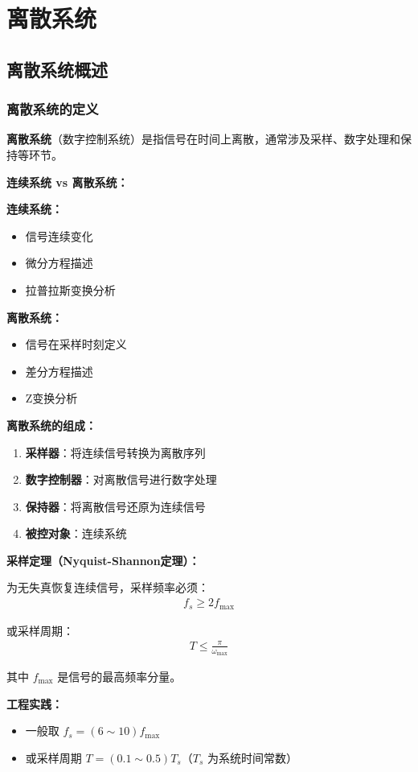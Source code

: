 \section{离散系统}

\subsection{离散系统概述}

\subsubsection{离散系统的定义}

\textbf{离散系统}（数字控制系统）是指信号在时间上离散，通常涉及采样、数字处理和保持等环节。

\begin{minipage}[t]{0.52\textwidth}
\textbf{连续系统 vs 离散系统：}

\textbf{连续系统：}
\begin{itemize}
    \item 信号连续变化
    \item 微分方程描述
    \item 拉普拉斯变换分析
\end{itemize}

\textbf{离散系统：}
\begin{itemize}
    \item 信号在采样时刻定义
    \item 差分方程描述
    \item Z变换分析
\end{itemize}

\vspace{0.3cm}
\textbf{离散系统的组成：}

\begin{enumerate}
    \item \textbf{采样器}：将连续信号转换为离散序列
    \item \textbf{数字控制器}：对离散信号进行数字处理
    \item \textbf{保持器}：将离散信号还原为连续信号
    \item \textbf{被控对象}：连续系统
\end{enumerate}

\vspace{0.3cm}
\textbf{采样定理（Nyquist-Shannon定理）：}

为无失真恢复连续信号，采样频率必须：
\begin{align*}
f_s \geq 2f_{\max}
\end{align*}

或采样周期：
\begin{align*}
T \leq \frac{\pi}{\omega_{\max}}
\end{align*}

其中 $f_{\max}$ 是信号的最高频率分量。

\textbf{工程实践：}
\begin{itemize}
    \item 一般取 $f_s = (6 \sim 10) f_{\max}$
    \item 或采样周期 $T = (0.1 \sim 0.5) T_s$（$T_s$ 为系统时间常数）
\end{itemize}
\end{minipage}\hfill
